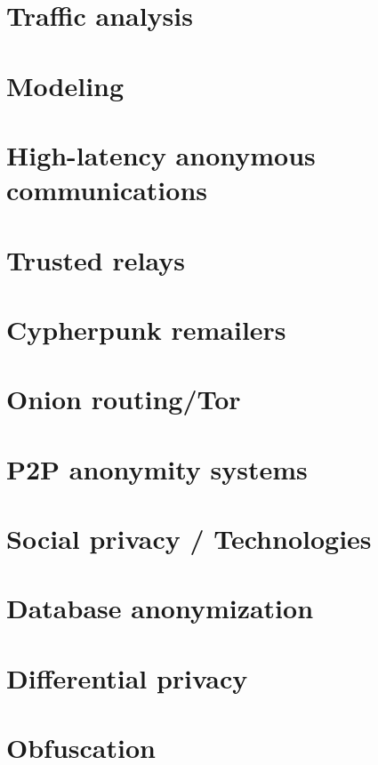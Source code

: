 \documentclass[a4paper,12pt,dutch]{article}
\begin{document}
\section{Traffic analysis}

\section{Modeling}

\section{High-latency anonymous communications}

\section{Trusted relays}

\section{Cypherpunk remailers}

\section{Onion routing/Tor}

\section{P2P anonymity systems}

\section{Social privacy / Technologies} %

\section{Database anonymization}

\section{Differential privacy}

\section{Obfuscation}
\end{document}
